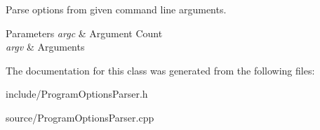 Parse options from given command line arguments. 


\begin{DoxyParams}{Parameters}
{\em argc} & Argument Count \\
\hline
{\em argv} & Arguments \\
\hline
\end{DoxyParams}


The documentation for this class was generated from the following files\+:\begin{DoxyCompactItemize}
\item 
include/Program\+Options\+Parser.\+h\item 
source/Program\+Options\+Parser.\+cpp\end{DoxyCompactItemize}
